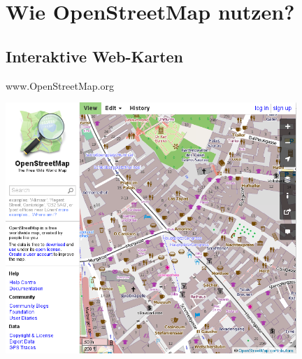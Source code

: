 \documentclass{beamer}
\begin{document}
\section{Wie OpenStreetMap nutzen?}

\subsection{Interaktive Web-Karten}
\begin{frame}{ www.OpenStreetMap.org}

 \includegraphics[width=11cm]{mainpage.png}

\end{frame}

%
%
%
%
%
%
\end{document}
